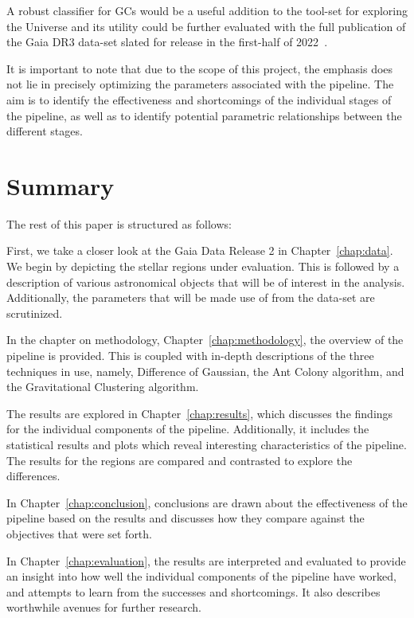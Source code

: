 A robust classifier for GCs would be a useful addition to the tool-set for exploring the Universe and its utility could be further evaluated with the full publication of the Gaia DR3 data-set slated for release in the first-half of 2022~\cite{GaiaDR3}.

It is important to note that due to the scope of this project, the emphasis does not lie in precisely optimizing the parameters associated with the pipeline.
The aim is to identify the effectiveness and shortcomings of the individual stages of the pipeline, as well as to identify potential parametric relationships between the different stages.

\section{Summary}

The rest of this paper is structured as follows:

First, we take a closer look at the Gaia Data Release 2 in
Chapter~\ref{chap:data}. We begin by depicting the stellar regions under
evaluation. This is followed by a description of various astronomical objects
that will be of interest in the analysis. Additionally, the parameters that will
be made use of from the data-set are scrutinized.

In the chapter on methodology, Chapter~\ref{chap:methodology}, the overview of
the pipeline is provided. This is coupled with in-depth descriptions of the
three techniques in use, namely, Difference of Gaussian, the Ant
Colony algorithm, and the Gravitational Clustering algorithm.

The results are explored in Chapter~\ref{chap:results}, which discusses the
findings for the individual components of the pipeline. Additionally, it includes the
statistical results and plots which reveal interesting characteristics of the
pipeline. The results for the regions are compared and contrasted to
explore the differences.

In Chapter~\ref{chap:conclusion}, conclusions are drawn about the effectiveness of the pipeline based on the results and discusses how they compare against the objectives that were set forth.

In Chapter~\ref{chap:evaluation}, the results are interpreted and evaluated to provide an insight into how well the individual components of the pipeline have worked, and attempts to learn from the successes and shortcomings. It also describes worthwhile avenues for further research.
